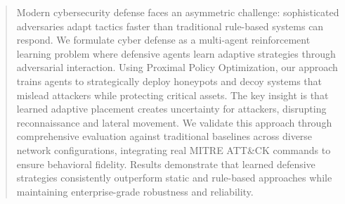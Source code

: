 \documentclass[12pt,oneside]{article}
\begin{document}



\tableofcontents
\clearpage  %

\begin{abstract}

\vspace{1em} %

Modern cybersecurity defense faces an asymmetric challenge: sophisticated adversaries adapt tactics faster than traditional rule-based systems can respond. We formulate cyber defense as a multi-agent reinforcement learning problem where defensive agents learn adaptive strategies through adversarial interaction. Using Proximal Policy Optimization, our approach trains agents to strategically deploy honeypots and decoy systems that mislead attackers while protecting critical assets. The key insight is that learned adaptive placement creates uncertainty for attackers, disrupting reconnaissance and lateral movement. We validate this approach through comprehensive evaluation against traditional baselines across diverse network configurations, integrating real MITRE ATT\&CK commands to ensure behavioral fidelity. Results demonstrate that learned defensive strategies consistently outperform static and rule-based approaches while maintaining enterprise-grade robustness and reliability.
\end{abstract}

\clearpage

\end{document}
